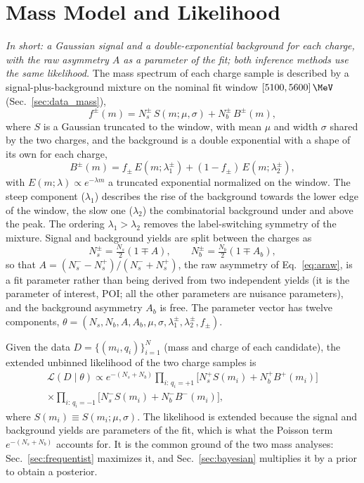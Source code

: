\section{Mass Model and Likelihood}
\label{sec:model}
\label{sec:bayes_model}
\emph{In short: a Gaussian signal and a double-exponential background for each charge, with the raw asymmetry $A$ as a parameter of the fit; both inference methods use the same likelihood.}
The mass spectrum of each charge sample is described by a signal-plus-background mixture on the nominal fit window $[5100,5600]\,\MeV$ (Sec.~\ref{sec:data_mass}),
\begin{equation}
f^{\pm}(m)=N_s^{\pm}\,S(m;\mu,\sigma)+N_b^{\pm}\,B^{\pm}(m),
\label{eq:mixture}
\end{equation}
where $S$ is a Gaussian truncated to the window, with mean $\mu$ and width $\sigma$ shared by the two charges, and the background is a double exponential with a shape of its own for each charge,
\[
B^{\pm}(m)=f_{\pm}\,E(m;\lambda_{1}^{\pm})+(1-f_{\pm})\,E(m;\lambda_{2}^{\pm}),
\]
with $E(m;\lambda)\propto e^{-\lambda m}$ a truncated exponential normalized on the window. The steep component ($\lambda_1$) describes the rise of the background towards the lower edge of the window, the slow one ($\lambda_2$) the combinatorial background under and above the peak. The ordering $\lambda_1>\lambda_2$ removes the label-switching symmetry of the mixture. Signal and background yields are split between the charges as
\[
N_s^{\pm}=\tfrac{N_s}{2}(1\mp A),\qquad N_b^{\pm}=\tfrac{N_b}{2}(1\mp A_b),
\]
so that $A=(N_s^--N_s^+)/(N_s^-+N_s^+)$, the raw asymmetry \Araw of Eq.~\eqref{eq:araw}, is a fit parameter rather than being derived from two independent yields (it is the parameter of interest, POI; all the other parameters are nuisance parameters), and the background asymmetry $A_b$ is free. The parameter vector has twelve components, $\theta=(N_s,N_b,A,A_b,\mu,\sigma,\lambda_1^{\pm},\lambda_2^{\pm},f_{\pm})$.

Given the data $D=\{(m_i,q_i)\}_{i=1}^{N}$ (mass and charge of each candidate), the extended unbinned likelihood of the two charge samples is
\begin{multline}
\mathcal{L}(D\mid\theta)\propto e^{-(N_s+N_b)}
\prod_{i:\,q_i=+1}\Big[N_s^{+}S(m_i)+N_b^{+}B^{+}(m_i)\Big] \\
\times\prod_{i:\,q_i=-1}\Big[N_s^{-}S(m_i)+N_b^{-}B^{-}(m_i)\Big],
\label{eq:likelihood}
\end{multline}
where $S(m_i)\equiv S(m_i;\mu,\sigma)$. The likelihood is extended because the signal and background yields are parameters of the fit, which is what the Poisson term $e^{-(N_s+N_b)}$ accounts for. It is the common ground of the two mass analyses: Sec.~\ref{sec:frequentist} maximizes it, and Sec.~\ref{sec:bayesian} multiplies it by a prior to obtain a posterior.

